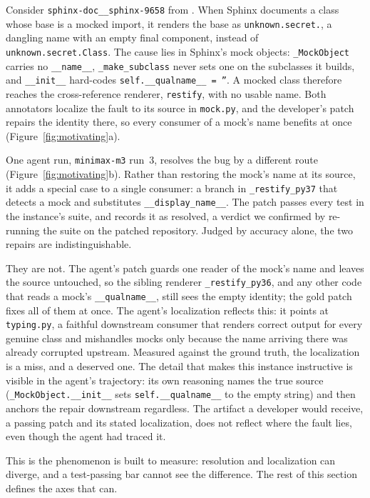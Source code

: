 Consider \texttt{sphinx-doc\_\_sphinx-9658} from \sweBenchVerified{}. When Sphinx documents
a class whose base is a mocked import, it renders the base as \texttt{unknown.secret.}, a
dangling name with an empty final component, instead of \texttt{unknown.secret.Class}. The
cause lies in Sphinx's mock objects: \texttt{\_MockObject} carries no \texttt{\_\_name\_\_},
\texttt{\_make\_subclass} never sets one on the subclasses it builds, and \texttt{\_\_init\_\_}
hard-codes \texttt{self.\_\_qualname\_\_ = ''}. A mocked class therefore reaches the
cross-reference renderer, \texttt{restify}, with no usable name. Both annotators localize
the fault to its source in \texttt{mock.py}, and the developer's patch repairs the identity
there, so every consumer of a mock's name benefits at once (Figure~\ref{fig:motivating}a).

One agent run, \texttt{minimax-m3} run~3, resolves the bug by a different route
(Figure~\ref{fig:motivating}b). Rather than restoring the mock's name at its source, it adds
a special case to a single consumer: a branch in \texttt{\_restify\_py37} that detects a mock
and substitutes \texttt{\_\_display\_name\_\_}. The patch passes every test in the instance's
suite, and \sweBenchVerified{} records it as resolved, a verdict we confirmed by re-running
the suite on the patched repository. Judged by accuracy alone, the two repairs are
indistinguishable.

They are not. The agent's patch guards one reader of the mock's name and leaves the source
untouched, so the sibling renderer \texttt{\_restify\_py36}, and any other code that reads a
mock's \texttt{\_\_qualname\_\_}, still sees the empty identity; the gold patch fixes all of
them at once. The agent's localization reflects this: it points at \texttt{typing.py}, a
faithful downstream consumer that renders correct output for every genuine class and
mishandles mocks only because the name arriving there was already corrupted upstream.
Measured against the ground truth, the localization is a miss, and a deserved one. The
detail that makes this instance instructive is visible in the agent's trajectory: its own
reasoning names the true source (\texttt{\_MockObject.\_\_init\_\_} sets
\texttt{self.\_\_qualname\_\_} to the empty string) and then anchors the repair downstream
regardless. The artifact a developer would receive, a passing patch and its stated
localization, does not reflect where the fault lies, even though the agent had traced it.

This is the phenomenon \trustRepair{} is built to measure: resolution and localization can
diverge, and a test-passing bar cannot see the difference. The rest of this section defines
the axes that can.

